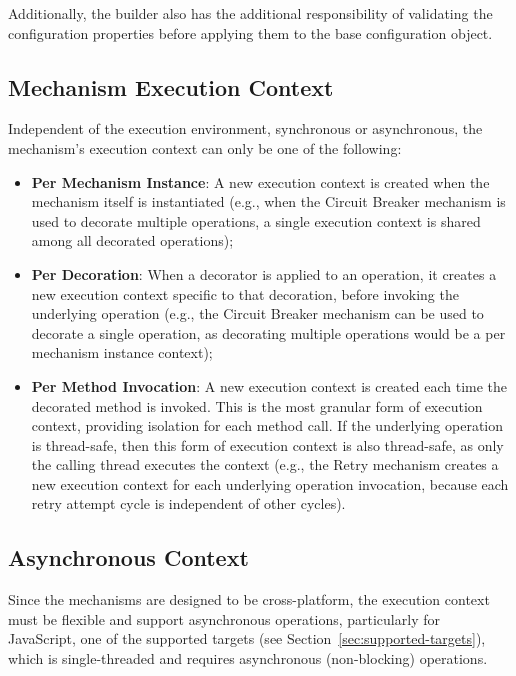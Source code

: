 Additionally, the builder also has the additional responsibility of validating the configuration properties before applying them to the base configuration object.

\subsection{Mechanism Execution Context}\label{subsec:mechanism-execution-context}

Independent of the execution environment, synchronous or asynchronous, the mechanism's execution context can only be one of the following:

\begin{itemize}
    \item \textbf{Per Mechanism Instance}: A new execution context is created when the mechanism itself is instantiated (e.g., when the Circuit Breaker mechanism is used to decorate multiple operations, a single execution context is shared among all decorated operations);
    \item \textbf{Per Decoration}: When a decorator is applied to an operation, it creates a new execution context specific to that decoration, before invoking the underlying operation (e.g., the Circuit Breaker mechanism can be used to decorate a single operation, as decorating multiple operations would be a per mechanism instance context);
    \item \textbf{Per Method Invocation}: A new execution context is created each time the decorated method is invoked.
    This is the most granular form of execution context, providing isolation for each method call.
    If the underlying operation is thread-safe, then this form of execution context is also thread-safe,
    as only the calling thread executes the context
    (e.g., the Retry mechanism creates a new execution context for each underlying operation invocation,
    because each retry attempt cycle is independent of other cycles).
\end{itemize}

\subsection{Asynchronous Context}\label{subsec:asynchronous-context}

Since the mechanisms are designed to be cross-platform, the execution context must be flexible and support asynchronous operations, particularly for JavaScript, one of the supported targets (see Section~\ref{sec:supported-targets}), which is single-threaded and requires asynchronous (non-blocking) operations.

